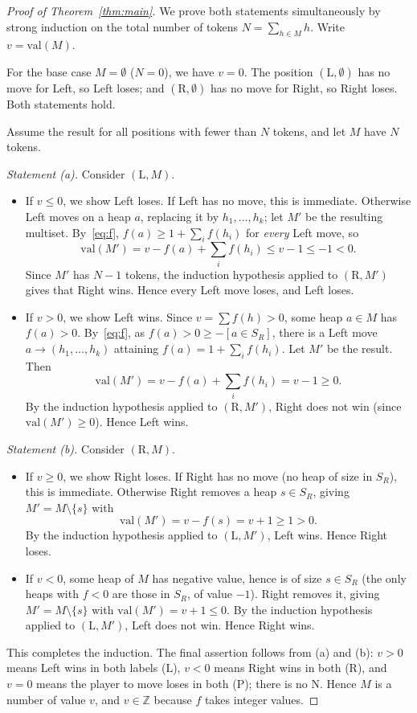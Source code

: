 \documentclass[11pt]{article}
\newcommand{\outL}{\ensuremath{\mathrm{L}}}
\newcommand{\outR}{\ensuremath{\mathrm{R}}}
\newcommand{\outP}{\ensuremath{\mathrm{P}}}
\newcommand{\outN}{\ensuremath{\mathrm{N}}}
\newcommand{\val}{\ensuremath{\mathrm{val}}}
\begin{document}
\begin{proof}[Proof of Theorem~\ref{thm:main}]
We prove both statements simultaneously by strong induction on the total number of tokens
$N=\sum_{h\in M}h$. Write $v=\val(M)$.

For the base case $M=\emptyset$ ($N=0$), we have $v=0$. The position $(\outL,\emptyset)$ has
no move for Left, so Left loses; and $(\outR,\emptyset)$ has no move for Right, so Right
loses. Both statements hold.

Assume the result for all positions with fewer than $N$ tokens, and let $M$ have $N$ tokens.

\emph{Statement (a).} Consider $(\outL,M)$.
\begin{itemize}
\item If $v\le 0$, we show Left loses. If Left has no move, this is immediate. Otherwise Left
moves on a heap $a$, replacing it by $h_1,\dots,h_k$; let $M'$ be the resulting multiset.
By~\eqref{eq:f}, $f(a)\ge 1+\sum_i f(h_i)$ for \emph{every} Left move, so
\[
\val(M')=v-f(a)+\sum_i f(h_i)\le v-1\le -1<0.
\]
Since $M'$ has $N-1$ tokens, the induction hypothesis applied to $(\outR,M')$ gives that
Right wins. Hence every Left move loses, and Left loses.
\item If $v>0$, we show Left wins. Since $v=\sum f(h)>0$, some heap $a\in M$ has $f(a)>0$.
By~\eqref{eq:f}, as $f(a)>0\ge -[a\in S_R]$, there is a Left move
$a\to(h_1,\dots,h_k)$ attaining $f(a)=1+\sum_i f(h_i)$. Let $M'$ be the result. Then
\[
\val(M')=v-f(a)+\sum_i f(h_i)=v-1\ge 0.
\]
By the induction hypothesis applied to $(\outR,M')$, Right does not win (since
$\val(M')\ge0$). Hence Left wins.
\end{itemize}

\emph{Statement (b).} Consider $(\outR,M)$.
\begin{itemize}
\item If $v\ge0$, we show Right loses. If Right has no move (no heap of size in $S_R$), this
is immediate. Otherwise Right removes a heap $s\in S_R$, giving $M'=M\setminus\{s\}$ with
\[
\val(M')=v-f(s)=v+1\ge1>0.
\]
By the induction hypothesis applied to $(\outL,M')$, Left wins. Hence Right loses.
\item If $v<0$, some heap of $M$ has negative value, hence is of size $s\in S_R$ (the only
heaps with $f<0$ are those in $S_R$, of value $-1$). Right removes it, giving
$M'=M\setminus\{s\}$ with $\val(M')=v+1\le0$. By the induction hypothesis applied to
$(\outL,M')$, Left does not win. Hence Right wins.
\end{itemize}

This completes the induction. The final assertion follows from (a) and (b): $v>0$ means Left
wins in both labels ($\outL$), $v<0$ means Right wins in both ($\outR$), and $v=0$ means the
player to move loses in both ($\outP$); there is no $\outN$. Hence $M$ is a number of value
$v$, and $v\in\mathbb{Z}$ because $f$ takes integer values.
\end{proof}
\end{document}
